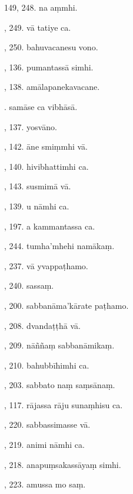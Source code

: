 149, 248. na aṃmhi.\hfill \pageref{sut:149}\par {}, 249. vā tatiye ca.\hfill \pageref{sut:150}\par {}, 250. bahuvacanesu vono.\hfill \pageref{sut:151}\par {}, 136. pumantassā simhi.\hfill \pageref{sut:152}\par {}, 138. amālapanekavacane.\hfill \pageref{sut:153}\par {}. samāse ca vibhāsā.\hfill \pageref{sut:154}\par {}, 137. yosvāno.\hfill \pageref{sut:155}\par {}, 142. āne smiṃmhi vā.\hfill \pageref{sut:156}\par {}, 140. hivibhattimhi ca.\hfill \pageref{sut:157}\par {}, 143. susmimā vā.\hfill \pageref{sut:158}\par {}, 139. u nāmhi ca.\hfill \pageref{sut:159}\par {}, 197. a kammantassa ca.\hfill \pageref{sut:160}\par {}, 244. tumha’mhehi namākaṃ.\hfill \pageref{sut:161}\par {}, 237. vā yvappaṭhamo.\hfill \pageref{sut:162}\par {}, 240. sassaṃ.\hfill \pageref{sut:163}\par {}, 200. sabbanāma’kārate paṭhamo.\hfill \pageref{sut:164}\par {}, 208. dvandaṭṭhā vā.\hfill \pageref{sut:165}\par {}, 209. nāññaṃ sabbanāmikaṃ.\hfill \pageref{sut:166}\par {}, 210. bahubbīhimhi ca.\hfill \pageref{sut:167}\par {}, 203. sabbato naṃ saṃsānaṃ.\hfill \pageref{sut:168}\par {}, 117. rājassa rāju sunaṃhisu ca.\hfill \pageref{sut:169}\par {}, 220. sabbassimasse vā.\hfill \pageref{sut:170}\par {}, 219. animi nāmhi ca.\hfill \pageref{sut:171}\par {}, 218. anapuṃsakassāyaṃ simhi.\hfill \pageref{sut:172}\par {}, 223. amussa mo saṃ.\hfill \pageref{sut:173}\par \noindent
